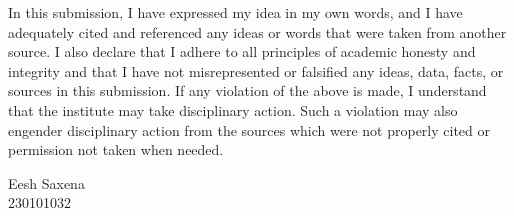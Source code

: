 \documentclass[a4paper, 11pt, oneside]{report}
\begin{document}
In this submission, I have expressed my idea in my own words, and I have adequately cited
and referenced any ideas or words that were taken from another source. I also declare that
I adhere to all principles of academic honesty and integrity and that I have not
misrepresented or falsified any ideas, data, facts, or sources in this submission. If any
violation of the above is made, I understand that the institute may take disciplinary
action. Such a violation may also engender disciplinary action from the sources which were
not properly cited or permission not taken when needed.

\vspace{1.5cm}
\begin{flushright}
Eesh Saxena \\
230101032
\end{flushright}


\newpage
\end{document}
